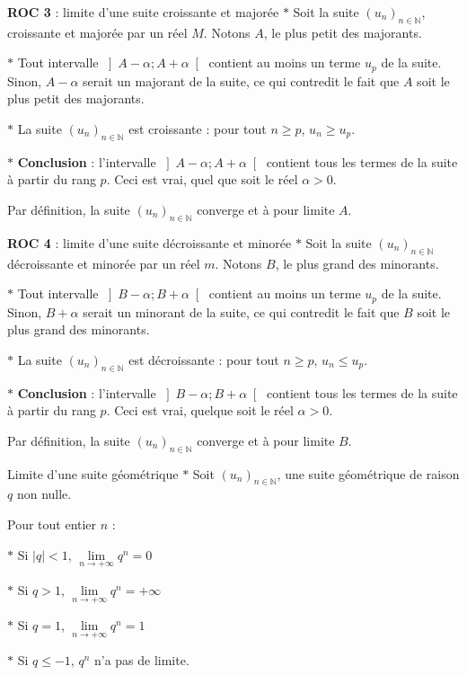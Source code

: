 \medskip

\begin{bclogo}{\textbf{ROC 3} : limite d'une suite croissante et majorée}
$\ast$ Soit la suite $(u_n)_{n\in\mathbb{N}}$, croissante et majorée par un réel $M$. Notons $A$, le plus petit des majorants.

\noindent
$\ast$ Tout intervalle $\left] A-\alpha ; A+\alpha \right[$  contient au moins un terme $u_p$ de la suite. Sinon, $A-\alpha $ serait un majorant de la suite, ce qui contredit le fait que $A$ soit le plus petit des majorants.

\noindent
$\ast$ La suite $(u_n)_{n\in\mathbb{N}}$ est croissante : pour tout $n\geqslant p$, $u_n \geqslant u_p$.

\noindent
$\ast$ \textbf{Conclusion} : l'intervalle $\left] A-\alpha ; A+\alpha \right[$ contient tous les termes de la suite à partir du rang $p$. Ceci est vrai, quel que soit le réel $\alpha > 0$. 

Par définition, la suite $(u_n)_{n\in\mathbb{N}}$ converge et à pour limite $A$.
\end{bclogo}

\newpage

\begin{bclogo}{\textbf{ROC 4} : limite d'une suite décroissante et minorée}
$\ast$ Soit la suite $(u_n)_{n\in\mathbb{N}}$ décroissante et minorée par un réel $m$. Notons $B$, le plus grand des minorants.

\noindent
$\ast$ Tout intervalle $\left] B-\alpha ; B+\alpha \right[$  contient au moins un terme $u_p$ de la suite. Sinon, $B+ \alpha $ serait un minorant de la suite, ce qui contredit le fait que $B$ soit le plus grand des minorants.


\noindent
$\ast$ La suite $(u_n)_{n\in\mathbb{N}}$ est décroissante : pour tout $n\geqslant p$, $u_n \leqslant u_p$.

\noindent
$\ast$ \textbf{Conclusion} : l'intervalle $\left] B-\alpha ; B+\alpha \right[$ contient tous les termes de la suite à partir du rang $p$. Ceci est vrai, quelque soit le réel $\alpha > 0$. 

Par définition, la suite $(u_n)_{n\in\mathbb{N}}$ converge et à pour limite $B$.
\end{bclogo}

\medskip

\begin{bclogo}{Limite d'une suite géométrique}
$\ast$ Soit $(u_n)_{n\in\mathbb{N}}$, une suite géométrique de raison $q$ non nulle. 

\noindent
Pour tout entier $n$ : 

\noindent
$\ast$ Si $|q|<1$, $\lim\limits_{n \to +\infty} q^n=0$

\noindent
$\ast$ Si $q>1$, $\lim\limits_{n \to +\infty} q^n=+\infty$

\noindent
$\ast$ Si $q=1$, $\lim\limits_{n \to +\infty} q^n=1$

\noindent
$\ast$ Si $q\leqslant -1$, $q^n$ n'a pas de limite.
\end{bclogo}

